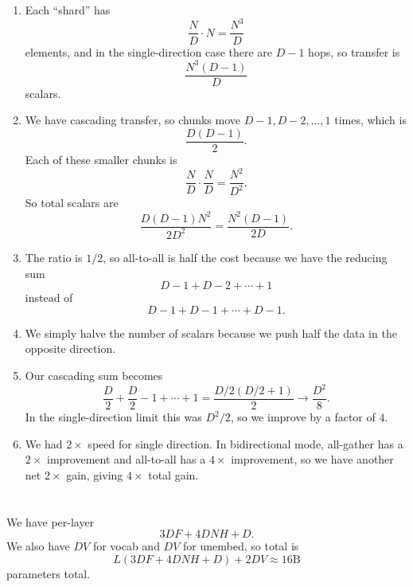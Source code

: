 \documentclass[11pt]{article}
\newcommand{\D}{D}
\newcommand{\F}{F}
\newcommand{\exercisebreak}{\Needspace{8\baselineskip}}
\begin{document}
\subsection{}
\begin{enumerate}
  \item Each ``shard'' has
  \[
    \frac{N}{D}\cdot N = \frac{N^3}{D}
  \]
  elements, and in the single-direction case there are $D-1$ hops, so transfer is
  \[
    \frac{N^3(D-1)}{D}
  \]
  scalars.

  \item We have cascading transfer, so chunks move $D-1,D-2,\ldots,1$ times, which is
  \[
    \frac{D(D-1)}{2}.
  \]
  Each of these smaller chunks is
  \[
    \frac{N}{D}\cdot \frac{N}{D}=\frac{N^2}{D^2}.
  \]
  So total scalars are
  \[
    \frac{D(D-1)N^2}{2D^2}
    =
    \frac{N^2(D-1)}{2D}.
  \]

  \item The ratio is $1/2$, so all-to-all is half the cost because we have the reducing sum
  \[
    D-1+D-2+\cdots+1
  \]
  instead of
  \[
    D-1+D-1+\cdots+D-1.
  \]

  \item We simply halve the number of scalars because we push half the data in the opposite direction.

  \item Our cascading sum becomes
  \[
    \frac{D}{2}+\frac{D}{2}-1+\cdots+1
    =
    \frac{D/2(D/2+1)}{2}
    \to
    \frac{D^2}{8}.
  \]
  In the single-direction limit this was $D^2/2$, so we improve by a factor of $4$.

  \item We had $2\times$ speed for single direction. In bidirectional mode, all-gather has a $2\times$ improvement and all-to-all has a $4\times$ improvement, so we have another net $2\times$ gain, giving $4\times$ total gain.
\end{enumerate}

\clearpage
\section{}

\exercisebreak
\subsection{}
We have per-layer
\[
  3\D\F + 4\D N H + \D.
\]
We also have $\D V$ for vocab and $\D V$ for unembed, so total is
\[
  L(3\D\F + 4\D N H + \D) + 2\D V \approx 16\mathrm{B}
\]
parameters total.
\end{document}
